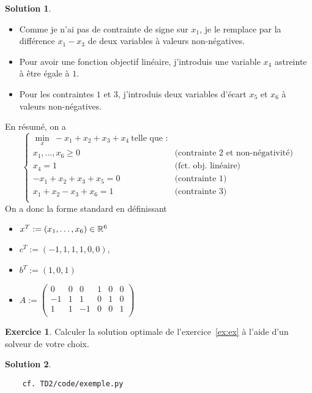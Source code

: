 \documentclass[a4paper,francais]{article}
\newcommand{\R}{{\ensuremath\mathbb{R}}}
\theoremstyle{definition}
\newtheorem{exercice}{Exercice}[section]
\newtheorem*{solution}{Solution}
\begin{document}
\begin{solution}
  \begin{itemize}
  \item Comme je n'ai pas de contrainte de signe sur $x_1$, je le remplace
    par la différence $x_1 - x_3$ de deux variables à valeurs non-négatives.
  \item Pour avoir une fonction objectif linéaire, j'introduis une variable
    $x_4$ astreinte à être égale à $1$.
  \item Pour les contraintes $1$ et $3$, j'introduis deux variables d'écart $x_5$ et $x_6$
    à valeurs non-négatives. 
  \end{itemize}
En résumé, on a 
\[
\left\{
\begin{array}{cl}
  \min_x \ -x_1 + x_2 + x_3 + x_4 \ \text{telle que :} & \\
  x_1, \dots, x_6 \geq 0 & \text{(contrainte 2 et non-négativité)} \\
  x_4 = 1 & \text{(fct. obj. linéaire)} \\
  -x_1 + x_2 + x_3 + x_5  = 0 & \text{(contrainte 1)} \\
  x_1 + x_2 - x_3 + x_6 = 1   & \text{(contrainte 3)} \\
\end{array}
\right.
\]
On a donc la forme standard en définissant
\begin{itemize}
\item $x^T := (x_1, \dots, x_6) \in \R^6$
\item $c^T := (-1, 1, 1, 1, 0, 0)$,
\item $b^T := (1, 0, 1)$
\item $A :=
  \left(
  \begin{array}{cccccc}
    0 & 0 & 0 & 1 & 0 & 0 \\
    -1 & 1 & 1 & 0 & 1 & 0 \\
    1 & 1 & -1 & 0 & 0 & 1 \\
  \end{array}
  \right)$
\end{itemize}
\end{solution}

\begin{exercice}
  Calculer la solution optimale de l'exercice~\ref{ex:ex} à l'aide d'un solveur
  de votre choix. 
\end{exercice}

\begin{solution}
\begin{verbatim}
    cf. TD2/code/exemple.py
\end{verbatim}
\end{solution}
\end{document}
